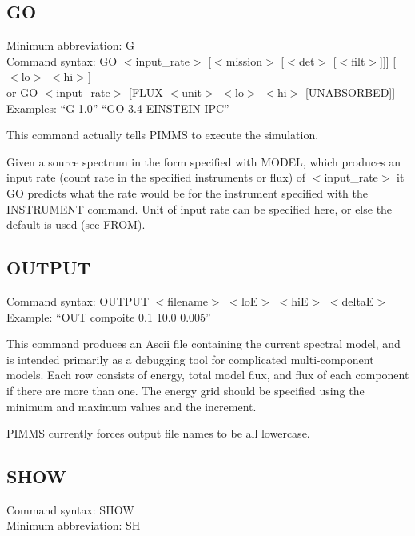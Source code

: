 \documentclass[11pt]{article}
\begin{document}
\begin{appendices}
\subsection{GO}

Minimum abbreviation: G \\
Command syntax: GO $<$input\_rate$>$ [$<$mission$>$ [$<$det$>$ [$<$filt$>$]]] [$<$lo$>$-$<$hi$>$] \\
\hspace{1.5 cm} or GO $<$input\_rate$>$ [FLUX $<$unit$>$ $<$lo$>$-$<$hi$>$ [UNABSORBED]] \\
Examples: ``G 1.0'' ``GO 3.4 EINSTEIN IPC'' \\
\vspace{0.5 cm}

This command actually tells PIMMS to execute the simulation.

Given a source spectrum in the form specified with MODEL,  which produces an
input rate (count rate in the specified instruments or flux) of $<$input\_rate$>$
it GO predicts what the rate  would be for the instrument specified with the
INSTRUMENT command.   Unit of input rate can be specified here,  or else the
default is used (see FROM).

\subsection{OUTPUT}

Command syntax: OUTPUT $<$filename$>$ $<$loE$>$ $<$hiE$>$ $<$deltaE$>$ \\
Example: ``OUT compoite 0.1 10.0 0.005'' \\
\vspace{0.5 cm}

This command produces an Ascii file containing the current spectral model,
and is intended primarily as a debugging tool for complicated multi-component
models.  Each row consists of energy, total model flux, and flux of each
component if there are more than one.  The energy grid should be specified
using the minimum and maximum values and the increment.

PIMMS currently forces output file names to be all lowercase.

\subsection{SHOW}

Command syntax: SHOW \\
Minimum abbreviation: SH \\
\vspace{0.5 cm}


\end{appendices}
\end{document}

